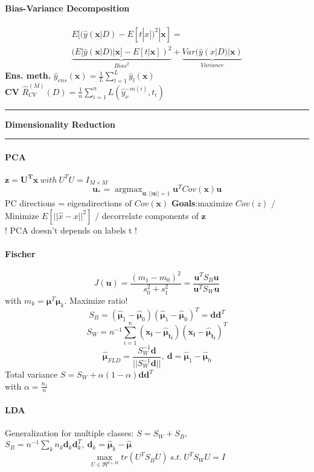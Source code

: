 \documentclass[7pt]{scrartcl}
\newlength{\secskip}
\renewcommand{\section}[1]{
  \vspace{\secskip}
  \hrule\vspace{.3em}
  \textbf{#1}
  \vspace{.3em}
  \hrule
  \vspace{\secskip}
}
\DeclareMathOperator*{\argmax}{argmax}
\renewcommand{\vec}{\mathbf}
\begin{document}
\begin{multicols}{4}
\paragraph{Bias-Variance Decomposition}
\begin{align*}
E[(\hat{y}(\vec{x}|D) - E[t|x])^2|\vec x] = \\ \underbrace{(E[\hat{y}(\vec{x}|D)|\vec{x}] - E[t|\vec{x}])^2}_{Bias^2} + \underbrace{Var(\hat{y}(x|D) | \vec{x})}_{Variance}
\end{align*}
\textbf{Ens. meth.}
$\hat{y}_{ens}(\vec{x}) = \frac{1}{L} \sum_{l=1}^L \hat{y}_l(\vec{x})$\\
\textbf{CV}
$\hat{R}_{CV}^{(M)}(D) = \frac{1}{n}\sum_{i=1}^n L(\hat{y}_\nu^{-m(i)},t_i)$

\section{Dimensionality Reduction}
\paragraph{PCA}
$\vec{z = U^T x} ~with~ U^TU=I_{M \times M}$
\[\vec{u}_* = \argmax_{\vec{u}:||\vec{u}||=1} \vec{u}^T Cov(\vec{x}) \vec{u}\]
PC directions = eigendirections of $Cov(\vec{x})$
\textbf{Goals}:maximize $Cov(z)$ / Minimize $E[||\hat{x}-x||^2]$ / decorrelate components of $\vec{z}$ \\
! PCA doesn't depends on labels t !
\paragraph{Fischer}
\[J(\vec{u}) = \frac{(m_1 - m_0)^2}{s_0^2 + s_1^2} = \frac{\vec{u}^T S_B \vec{u}}{\vec{u}^T S_W \vec{u}}\]
with $m_k = \vec{\mu}^T \vec{\mu}_k$. Maximize ratio!
\[S_B = (\hat{\vec{\mu}}_1 -\hat{\vec{\mu}}_0)(\hat{\vec{\mu}}_1 -\hat{\vec{\mu}}_0)^T = \vec d \vec d^T\]
\[S_W = n^{-1} \sum_{i=1}^n(\vec{x_i} - \vec{\hat{\mu}_{t_i}})(\vec{x_i} - \vec{\hat{\mu}_{t_i}})^T\]
\[\vec{\hat{\mu}}_{FLD} = \frac{S_W^{-1} \vec{d}}{||S_W^{-1} \vec{d}||}, ~ \vec{d} = \hat{\vec{\mu}}_1 -\hat{\vec{\mu}}_0\]
Total variance $S=S_W + \alpha(1-\alpha)\vec d \vec d^T$\\with $ \alpha = \frac{n_1}{n}$
\paragraph{LDA}
Generalization for multiple classes: $S=S_W+S_B$, $S_B = n^{-1}\sum_k n_k \vec d_k\vec d_k^T, ~ \vec d_k = \vec {\hat{\mu}}_k - \vec{ \hat{\mu}}$
\[\max_{U \in \Re^{d \times M}} tr(U^T S_B U) ~s.t.~ U^T S_WU = I\]


\end{multicols}
\end{document}
